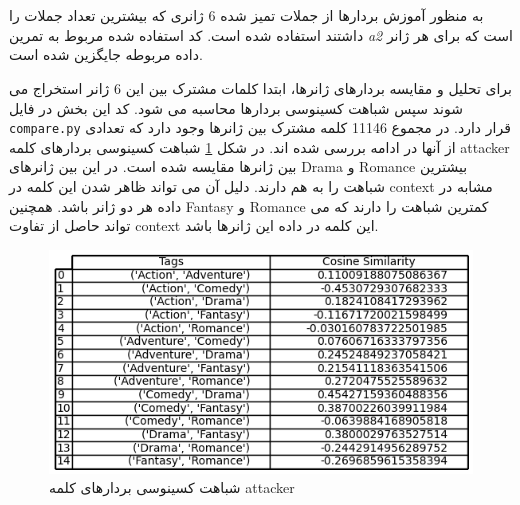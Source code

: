 \section{}
به منظور آموزش بردارها از جملات تمیز شده 6 ژانری که بیشترین تعداد جملات را داشتند استفاده شده است. کد استفاده شده مربوط به تمرین 
\textit{a2}
است که برای هر ژانر داده مربوطه جایگزین شده است. 

برای تحلیل و مقایسه بردارهای ژانرها، ابتدا کلمات مشترک بین این 6 ژانر استخراج می شوند سپس شباهت کسینوسی بردارها محاسبه می شود. کد این بخش در فایل
\texttt{compare.py}
قرار دارد. در مجموع 11146 کلمه مشترک بین ژانرها وجود دارد که تعدادی از آنها در ادامه بررسی شده اند.
در شکل \ref{fig11} شباهت کسینوسی بردارهای کلمه attacker بین ژانرها مقایسه شده است. در این بین ژانرهای
Drama
و
Romance
بیشترین شباهت را به هم دارند. دلیل آن می تواند ظاهر شدن این کلمه در context مشابه در داده هر دو ژانر باشد. همچنین
Fantasy
و
Romance
کمترین شباهت را دارند که می تواند حاصل از تفاوت context این کلمه در داده این ژانرها باشد. 
 \begin{figure}[H]
	\centering
	
	\includegraphics[width=1\textwidth,height=1\textheight,keepaspectratio]{../reports/word2vec/attacker}
	\caption{شباهت کسینوسی بردارهای کلمه attacker}
	\label{fig11}
	
\end{figure} 

